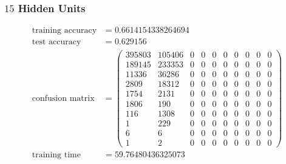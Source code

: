 \documentclass[11pt]{article}
\begin{document}
\subsubsection{$15$ Hidden Units}
\begin{equation}
  \begin{split}
    \text{training accuracy} &= 0.6614154338264694\\
    \text{test accuracy} &= 0.629156\\
    \text{confusion matrix} &=
    \begin{pmatrix}
      395803 & 105406 & 0 & 0 & 0 & 0 & 0 & 0 & 0 & 0 \\
      189145 & 233353 & 0 & 0 & 0 & 0 & 0 & 0 & 0 & 0 \\
      11336  & 36286  & 0 & 0 & 0 & 0 & 0 & 0 & 0 & 0 \\
      2809   & 18312  & 0 & 0 & 0 & 0 & 0 & 0 & 0 & 0 \\
      1754   & 2131   & 0 & 0 & 0 & 0 & 0 & 0 & 0 & 0 \\
      1806   & 190    & 0 & 0 & 0 & 0 & 0 & 0 & 0 & 0 \\
      116    & 1308   & 0 & 0 & 0 & 0 & 0 & 0 & 0 & 0 \\
      1      & 229    & 0 & 0 & 0 & 0 & 0 & 0 & 0 & 0 \\
      6      & 6      & 0 & 0 & 0 & 0 & 0 & 0 & 0 & 0 \\
      1      & 2      & 0 & 0 & 0 & 0 & 0 & 0 & 0 & 0
    \end{pmatrix}\\
    \text{training time} &= 59.76480436325073
  \end{split}
\end{equation}
\end{document}
